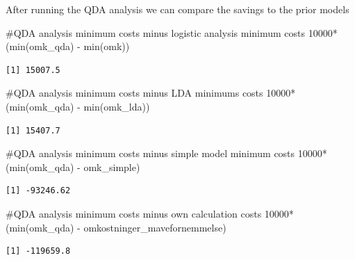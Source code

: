 \documentclass[
  letterpaper,
  DIV=11,
  numbers=noendperiod]{scrartcl}
\newenvironment{Shaded}{\begin{snugshade}}{\end{snugshade}}
\newcommand{\CommentTok}[1]{\textcolor[rgb]{0.37,0.37,0.37}{#1}}
\newcommand{\DecValTok}[1]{\textcolor[rgb]{0.68,0.00,0.00}{#1}}
\newcommand{\FunctionTok}[1]{\textcolor[rgb]{0.28,0.35,0.67}{#1}}
\newcommand{\NormalTok}[1]{\textcolor[rgb]{0.00,0.23,0.31}{#1}}
\newcommand{\SpecialCharTok}[1]{\textcolor[rgb]{0.37,0.37,0.37}{#1}}
\begin{document}
After running the QDA analysis we can compare the savings to the prior
models

\begin{Shaded}
\begin{Highlighting}[]
\CommentTok{\#QDA analysis minimum costs minus logistic analysis minimum costs}
\DecValTok{10000}\SpecialCharTok{*}\NormalTok{(}\FunctionTok{min}\NormalTok{(omk\_qda) }\SpecialCharTok{{-}} \FunctionTok{min}\NormalTok{(omk)) }
\end{Highlighting}
\end{Shaded}

\begin{verbatim}
[1] 15007.5
\end{verbatim}

\begin{Shaded}
\begin{Highlighting}[]
\CommentTok{\#QDA analysis minimum costs minus LDA minimums costs}
\DecValTok{10000}\SpecialCharTok{*}\NormalTok{(}\FunctionTok{min}\NormalTok{(omk\_qda) }\SpecialCharTok{{-}} \FunctionTok{min}\NormalTok{(omk\_lda)) }
\end{Highlighting}
\end{Shaded}

\begin{verbatim}
[1] 15407.7
\end{verbatim}

\begin{Shaded}
\begin{Highlighting}[]
\CommentTok{\#QDA analysis minimum costs minus simple model minimum costs}
\DecValTok{10000}\SpecialCharTok{*}\NormalTok{(}\FunctionTok{min}\NormalTok{(omk\_qda) }\SpecialCharTok{{-}}\NormalTok{ omk\_simple)}
\end{Highlighting}
\end{Shaded}

\begin{verbatim}
[1] -93246.62
\end{verbatim}

\begin{Shaded}
\begin{Highlighting}[]
\CommentTok{\#QDA analysis minimum costs minus own calculation costs}
\DecValTok{10000}\SpecialCharTok{*}\NormalTok{(}\FunctionTok{min}\NormalTok{(omk\_qda) }\SpecialCharTok{{-}}\NormalTok{ omkostninger\_mavefornemmelse)}
\end{Highlighting}
\end{Shaded}

\begin{verbatim}
[1] -119659.8
\end{verbatim}
\end{document}
